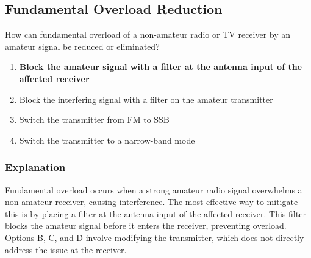\subsection{Fundamental Overload Reduction}
\label{T7B05}

\begin{tcolorbox}[colback=gray!10!white,colframe=black!75!black,title=T7B05]
How can fundamental overload of a non-amateur radio or TV receiver by an amateur signal be reduced or eliminated?
\begin{enumerate}[noitemsep]
    \item \textbf{Block the amateur signal with a filter at the antenna input of the affected receiver}
    \item Block the interfering signal with a filter on the amateur transmitter
    \item Switch the transmitter from FM to SSB
    \item Switch the transmitter to a narrow-band mode
\end{enumerate}
\end{tcolorbox}

\subsubsection*{Explanation}
Fundamental overload occurs when a strong amateur radio signal overwhelms a non-amateur receiver, causing interference. The most effective way to mitigate this is by placing a filter at the antenna input of the affected receiver. This filter blocks the amateur signal before it enters the receiver, preventing overload. Options B, C, and D involve modifying the transmitter, which does not directly address the issue at the receiver.
